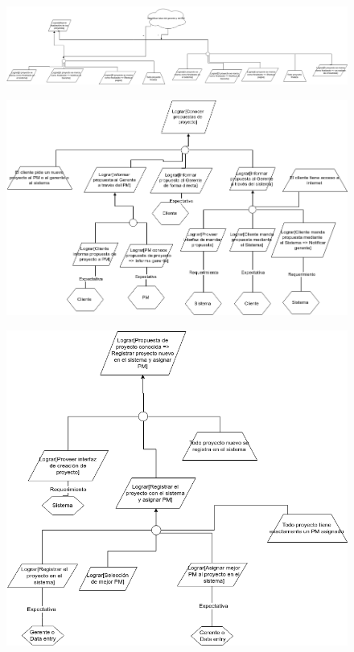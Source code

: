 \vspace{1em}

\begin{figure}[H]
    \centering
    \includegraphics[width=8in, keepaspectratio, angle=90]{imagenes/objetivos-finalizacion-principal.png}
\end{figure}

\vspace{1em}

\begin{figure}[H]
    \centering
    \includegraphics[width=\textwidth]{imagenes/objetivos-creacion-1.png}
\end{figure}

\vspace{1em}

\begin{figure}[H]
    \centering
    \includegraphics[width=\textwidth]{imagenes/objetivos-creacion-2.png}
\end{figure}

